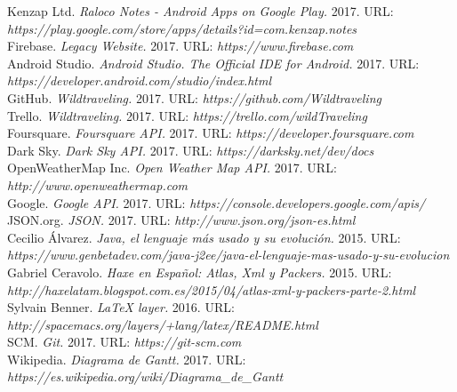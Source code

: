\documentclass[
11pt, %
english,
spanish,
catalan,
singlespacing, %
headsepline %
]{MastersDoctoralThesis} %
\begin{document}
\begin{thebibliography}
   Kenzap Ltd. {\em Raloco Notes - Android Apps on Google Play.}  2017. URL: {\em https://play.google.com/store/apps/details?id=com.kenzap.notes}\\
            
   Firebase. {\em Legacy Website.}  2017. URL: {\em https://www.firebase.com}\\
    
   Android Studio. {\em Android Studio. The Official IDE for Android.}  2017. URL: {\em https://developer.android.com/studio/index.html}\\
            
   GitHub. {\em Wildtraveling.} 2017. URL: {\em https://github.com/Wildtraveling}\\
  
   Trello. {\em Wildtraveling.}  2017. URL: {\em https://trello.com/wildTraveling}\\
  
   Foursquare. {\em Foursquare API.}  2017. URL: {\em https://developer.foursquare.com}\\
  
   Dark Sky. {\em Dark Sky API.}  2017. URL: {\em https://darksky.net/dev/docs}\\
  
   OpenWeatherMap Inc. {\em Open Weather Map API.}  2017. URL: {\em http://www.openweathermap.com}\\
  
   Google. {\em Google API.}  2017. URL: {\em https://console.developers.google.com/apis/}\\
  
   JSON.org. {\em JSON.}  2017. URL: {\em http://www.json.org/json-es.html}\\
  
   Cecilio Álvarez. {\em Java, el lenguaje más usado y su evolución.}  2015. URL: {\em https://www.genbetadev.com/java-j2ee/java-el-lenguaje-mas-usado-y-su-evolucion}\\
   
   Gabriel Ceravolo. {\em Haxe en Español: Atlas, Xml y Packers.}  2015. URL: {\em http://haxelatam.blogspot.com.es/2015/04/atlas-xml-y-packers-parte-2.html}\\
  
   Sylvain Benner. {\em LaTeX layer.}  2016. URL: {\em http://spacemacs.org/layers/+lang/latex/README.html}  \\
  
   SCM. {\em Git.}  2017. URL: {\em https://git-scm.com}\\  
  
   Wikipedia.  {\em Diagrama de Gantt.}  2017. URL: {\em https://es.wikipedia.org/wiki/Diagrama_de_Gantt}
  
  \end{thebibliography}

\end{document}

